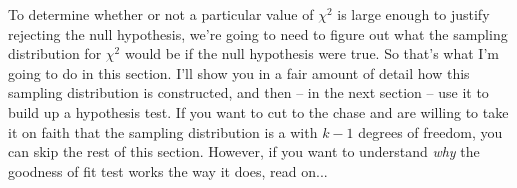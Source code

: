
To determine whether or not a particular value of $\chi^2$ is large enough to justify rejecting the null hypothesis, we're going to need to figure out what the sampling distribution for $\chi^2$ would be if the null hypothesis were true. So that's what I'm going to do in this section. I'll show you in a fair amount of detail how this sampling distribution is constructed, and then -- in the next section -- use it to build up a hypothesis test. If you want to cut to the chase and are willing to take it on faith that the sampling distribution is a  with $k-1$ degrees of freedom, you can skip the rest of this section. However, if you want to understand {\it why} the goodness of fit test works the way it does, read on...

